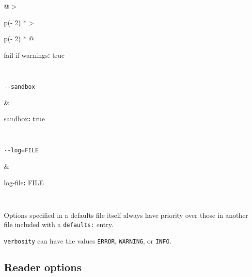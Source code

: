 \documentclass[
]{article}
\newenvironment{Shaded}{}{}
\newcommand{\AttributeTok}[1]{\textcolor[rgb]{0.49,0.56,0.16}{#1}}
\newcommand{\CharTok}[1]{\textcolor[rgb]{0.25,0.44,0.63}{#1}}
\newcommand{\FunctionTok}[1]{\textcolor[rgb]{0.02,0.16,0.49}{#1}}
\newcommand{\KeywordTok}[1]{\textcolor[rgb]{0.00,0.44,0.13}{\textbf{#1}}}
\begin{document}
\begin{longtable}[]{@{}
  >{\raggedright\arraybackslash}p{(\columnwidth - 2\tabcolsep) * }
  >{\raggedright\arraybackslash}p{(\columnwidth - 2\tabcolsep) * }@{}}
\begin{minipage}[t]{\linewidth}
\begin{Shaded}
\begin{Highlighting}[]
\FunctionTok{fail{-}if{-}warnings}\KeywordTok{:}\AttributeTok{ }\CharTok{true}
\end{Highlighting}
\end{Shaded}
\end{minipage} \\
\begin{minipage}[t]{\linewidth}\raggedright
\begin{verbatim}
--sandbox
\end{verbatim}
\end{minipage} & \begin{minipage}[t]{\linewidth}\raggedright
\begin{Shaded}
\begin{Highlighting}[]
\FunctionTok{sandbox}\KeywordTok{:}\AttributeTok{ }\CharTok{true}
\end{Highlighting}
\end{Shaded}
\end{minipage} \\
\begin{minipage}[t]{\linewidth}\raggedright
\begin{verbatim}
--log=FILE
\end{verbatim}
\end{minipage} & \begin{minipage}[t]{\linewidth}\raggedright
\begin{Shaded}
\begin{Highlighting}[]
\FunctionTok{log{-}file}\KeywordTok{:}\AttributeTok{ FILE}
\end{Highlighting}
\end{Shaded}
\end{minipage} \\
\end{longtable}

Options specified in a defaults file itself always have priority over
those in another file included with a \texttt{defaults:} entry.

\texttt{verbosity} can have the values \texttt{ERROR}, \texttt{WARNING},
or \texttt{INFO}.

\subsection{Reader options}\label{reader-options-1}
\end{document}
